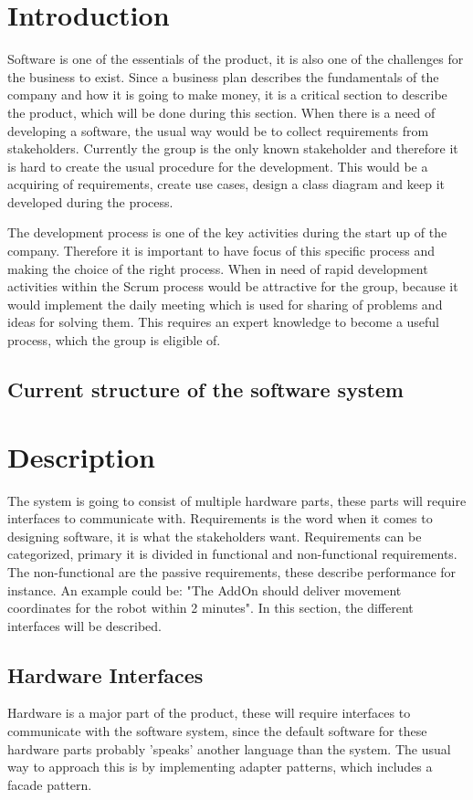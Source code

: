 \documentclass[12pt]{report} %
\begin{document}
\section{Introduction}
Software is one of the essentials of the product, it is also one of the challenges for the business to exist. Since a business plan describes the fundamentals of the company and how it is going to make money, it is a critical section to describe the product, which will be done during this section. When there is a need of developing a software, the usual way would be to collect requirements from stakeholders. Currently the group is the only known stakeholder and therefore it is hard to create the usual procedure for the development. This would be a acquiring of requirements, create use cases, design a class diagram and keep it developed during the process. 

The development process is one of the key activities during the start up of the company. Therefore it is important to have focus of this specific process and making the choice of the right process. When in need of rapid development activities within the Scrum process would be attractive for the group, because it would implement the daily meeting which is used for sharing of problems and ideas for solving them. This requires an expert knowledge to become a useful process, which the group is eligible of.

\subsection{Current structure of the software system}


\section{Description}
The system is going to consist of multiple hardware parts, these parts will require interfaces to communicate with. Requirements is the word when it comes to designing software, it is what the stakeholders want. Requirements can be categorized, primary it is divided in functional and non-functional requirements. The non-functional are the passive requirements, these describe performance for instance. An example could be: "The AddOn should deliver movement coordinates for the robot within 2 minutes". In this section, the different interfaces will be described. 

\subsection{Hardware Interfaces}
Hardware is a major part of the product, these will require interfaces to communicate with the software system, since the default software for these hardware parts probably 'speaks' another language than the system. The usual way to approach this is by implementing adapter patterns, which includes a facade pattern. 
\end{document}

